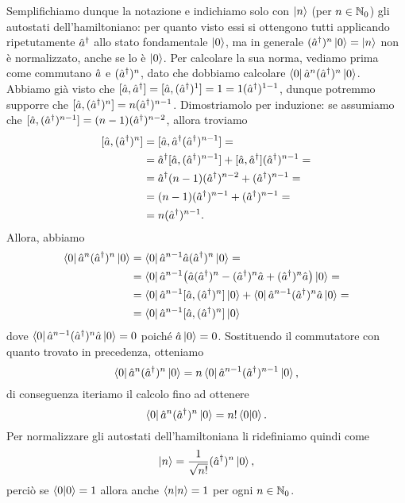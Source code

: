 Semplifichiamo dunque la notazione e indichiamo solo con $\left|{n}\right\rangle$ (per $n\in\mathbb{N}_0$) gli autostati dell'hamiltoniano: per quanto visto essi si ottengono tutti applicando ripetutamente ${\hat{a}}^\dagger$ allo stato fondamentale $\left|{0}\right\rangle$, ma in generale $({\hat{a}}^\dagger)^n\left|{0}\right\rangle=\left|{n}\right\rangle$ non è normalizzato, anche se lo è $\left|{0}\right\rangle$.
Per calcolare la sua norma, vediamo prima come commutano $\hat{a}$ e $({\hat{a}}^\dagger)^n$, dato che dobbiamo calcolare $\left\langle{0}\right|\hat{a}^n({\hat{a}}^\dagger)^n\left|{0}\right\rangle$.
Abbiamo già visto che $[\hat{a},{\hat{a}}^\dagger]=[\hat{a},({\hat{a}}^\dagger)^1]=1=1({\hat{a}}^\dagger)^{1-1}$, dunque potremmo supporre che $[\hat{a},({\hat{a}}^\dagger)^n]=n({\hat{a}}^\dagger)^{n-1}$.
Dimostriamolo per induzione: se assumiamo che $[\hat{a},({\hat{a}}^\dagger)^{n-1}]=(n-1)({\hat{a}}^\dagger)^{n-2}$, allora troviamo
\begin{equation}
	\begin{split}
		[\hat{a},({\hat{a}}^\dagger)^n]&=[\hat{a},{\hat{a}}^\dagger({\hat{a}}^\dagger)^{n-1}]=\\
		&={\hat{a}}^\dagger[\hat{a},({\hat{a}}^\dagger)^{n-1}]+[\hat{a},{\hat{a}}^\dagger]({\hat{a}}^\dagger)^{n-1}=\\
		&={\hat{a}}^\dagger(n-1)({\hat{a}}^\dagger)^{n-2}+({\hat{a}}^\dagger)^{n-1}=\\
		&=(n-1)({\hat{a}}^\dagger)^{n-1}+({\hat{a}}^\dagger)^{n-1}=\\
		&=n({\hat{a}}^\dagger)^{n-1}.
	\end{split}
\end{equation}
Allora, abbiamo
\begin{equation}
	\begin{split}
		\left\langle{0}\right|\hat{a}^n({\hat{a}}^\dagger)^n\left|{0}\right\rangle&=\left\langle{0}\right|\hat{a}^{n-1}\hat{a}({\hat{a}}^\dagger)^n\left|{0}\right\rangle=\\
		&=\left\langle{0}\right|\hat{a}^{n-1}\big(\hat{a}({\hat{a}}^\dagger)^n-({\hat{a}}^\dagger)^n\hat{a}+({\hat{a}}^\dagger)^n\hat{a}\big)\left|{0}\right\rangle=\\
		&=\left\langle{0}\right|\hat{a}^{n-1}[\hat{a},({\hat{a}}^\dagger)^n]\left|{0}\right\rangle+\left\langle{0}\right|\hat{a}^{n-1}({\hat{a}}^\dagger)^n\hat{a}\left|{0}\right\rangle=\\
		&=\left\langle{0}\right|\hat{a}^{n-1}[\hat{a},({\hat{a}}^\dagger)^n]\left|{0}\right\rangle
	\end{split}
\end{equation}
dove $\left\langle{0}\right|\hat{a}^{n-1}({\hat{a}}^\dagger)^n\hat{a}\left|{0}\right\rangle=0$ poich\'e $\hat{a}\left|{0}\right\rangle=0$.
Sostituendo il commutatore con quanto trovato in precedenza, otteniamo
\begin{equation}
	\left\langle{0}\right|\hat{a}^n({\hat{a}}^\dagger)^n\left|{0}\right\rangle=n\left\langle{0}\right|\hat{a}^{n-1}({\hat{a}}^\dagger)^{n-1}\left|{0}\right\rangle,
\end{equation}
di conseguenza iteriamo il calcolo fino ad ottenere
\begin{equation}
	\left\langle{0}\right|\hat{a}^n({\hat{a}}^\dagger)^n\left|{0}\right\rangle=n!\left\langle{0}\middle|{0}\right\rangle.
\end{equation}
Per normalizzare gli autostati dell'hamiltoniana li ridefiniamo quindi come
\begin{equation}
	\left|{n}\right\rangle=\frac1{\sqrt{n!}}({\hat{a}}^\dagger)^n\left|{0}\right\rangle,
	\label{eq:oscillatore-armonico-autostati-ortonormali}
\end{equation}
perciò se $\left\langle{0}\middle|{0}\right\rangle=1$ allora anche $\left\langle{n}\middle|{n}\right\rangle=1$ per ogni $n\in\mathbb{N}_0$.

